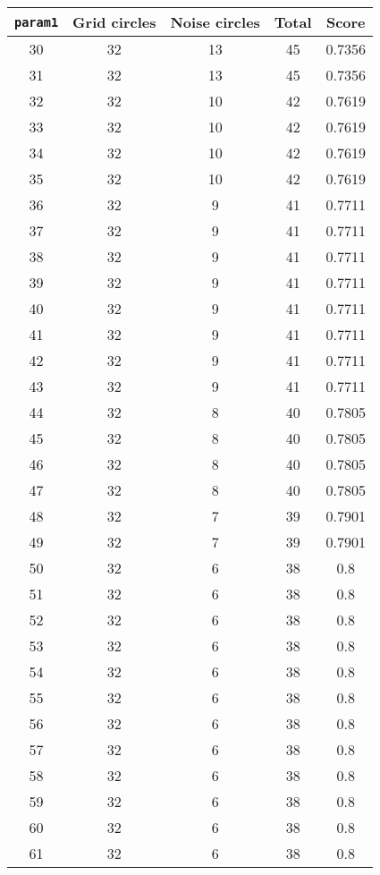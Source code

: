 \documentclass[letterpaper, 12pt]{article}
\begin{document}
\begin{longtable}{|c|c|c|c|c|}
\hline
\textbf{\texttt{param1}} & \textbf{Grid circles} & \textbf{Noise circles} & \textbf{Total} & \textbf{Score} \\
\hline
30 & 32 & 13 & 45 & 0.7356 \\
\hline
31 & 32 & 13 & 45 & 0.7356 \\
\hline
32 & 32 & 10 & 42 & 0.7619 \\
\hline
33 & 32 & 10 & 42 & 0.7619 \\
\hline
34 & 32 & 10 & 42 & 0.7619 \\
\hline
35 & 32 & 10 & 42 & 0.7619 \\
\hline
36 & 32 & 9 & 41 & 0.7711 \\
\hline
37 & 32 & 9 & 41 & 0.7711 \\
\hline
38 & 32 & 9 & 41 & 0.7711 \\
\hline
39 & 32 & 9 & 41 & 0.7711 \\
\hline
40 & 32 & 9 & 41 & 0.7711 \\
\hline
41 & 32 & 9 & 41 & 0.7711 \\
\hline
42 & 32 & 9 & 41 & 0.7711 \\
\hline
43 & 32 & 9 & 41 & 0.7711 \\
\hline
44 & 32 & 8 & 40 & 0.7805 \\
\hline
45 & 32 & 8 & 40 & 0.7805 \\
\hline
46 & 32 & 8 & 40 & 0.7805 \\
\hline
47 & 32 & 8 & 40 & 0.7805 \\
\hline
48 & 32 & 7 & 39 & 0.7901 \\
\hline
49 & 32 & 7 & 39 & 0.7901 \\
\hline
50 & 32 & 6 & 38 & 0.8 \\
\hline
51 & 32 & 6 & 38 & 0.8 \\
\hline
52 & 32 & 6 & 38 & 0.8 \\
\hline
53 & 32 & 6 & 38 & 0.8 \\
\hline
54 & 32 & 6 & 38 & 0.8 \\
\hline
55 & 32 & 6 & 38 & 0.8 \\
\hline
56 & 32 & 6 & 38 & 0.8 \\
\hline
57 & 32 & 6 & 38 & 0.8 \\
\hline
58 & 32 & 6 & 38 & 0.8 \\
\hline
59 & 32 & 6 & 38 & 0.8 \\
\hline
60 & 32 & 6 & 38 & 0.8 \\
\hline
61 & 32 & 6 & 38 & 0.8 \\

\end{longtable}
\end{document}
